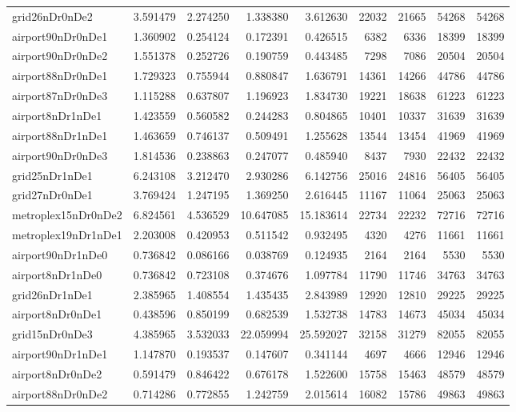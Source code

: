 \begin{longtable}{|l|r|r|r|r|r|r|r|r|}
grid26nDr0nDe2 & 3.591479 & 2.274250 & 1.338380 & 3.612630 & 22032 & 21665 & 54268 & 54268 \\
airport90nDr0nDe1 & 1.360902 & 0.254124 & 0.172391 & 0.426515 & 6382 & 6336 & 18399 & 18399 \\
airport90nDr0nDe2 & 1.551378 & 0.252726 & 0.190759 & 0.443485 & 7298 & 7086 & 20504 & 20504 \\
airport88nDr0nDe1 & 1.729323 & 0.755944 & 0.880847 & 1.636791 & 14361 & 14266 & 44786 & 44786 \\
airport87nDr0nDe3 & 1.115288 & 0.637807 & 1.196923 & 1.834730 & 19221 & 18638 & 61223 & 61223 \\
airport8nDr1nDe1 & 1.423559 & 0.560582 & 0.244283 & 0.804865 & 10401 & 10337 & 31639 & 31639 \\
airport88nDr1nDe1 & 1.463659 & 0.746137 & 0.509491 & 1.255628 & 13544 & 13454 & 41969 & 41969 \\
airport90nDr0nDe3 & 1.814536 & 0.238863 & 0.247077 & 0.485940 & 8437 & 7930 & 22432 & 22432 \\
grid25nDr1nDe1 & 6.243108 & 3.212470 & 2.930286 & 6.142756 & 25016 & 24816 & 56405 & 56405 \\
grid27nDr0nDe1 & 3.769424 & 1.247195 & 1.369250 & 2.616445 & 11167 & 11064 & 25063 & 25063 \\
metroplex15nDr0nDe2 & 6.824561 & 4.536529 & 10.647085 & 15.183614 & 22734 & 22232 & 72716 & 72716 \\
metroplex19nDr1nDe1 & 2.203008 & 0.420953 & 0.511542 & 0.932495 & 4320 & 4276 & 11661 & 11661 \\
airport90nDr1nDe0 & 0.736842 & 0.086166 & 0.038769 & 0.124935 & 2164 & 2164 & 5530 & 5530 \\
airport8nDr1nDe0 & 0.736842 & 0.723108 & 0.374676 & 1.097784 & 11790 & 11746 & 34763 & 34763 \\
grid26nDr1nDe1 & 2.385965 & 1.408554 & 1.435435 & 2.843989 & 12920 & 12810 & 29225 & 29225 \\
airport8nDr0nDe1 & 0.438596 & 0.850199 & 0.682539 & 1.532738 & 14783 & 14673 & 45034 & 45034 \\
grid15nDr0nDe3 & 4.385965 & 3.532033 & 22.059994 & 25.592027 & 32158 & 31279 & 82055 & 82055 \\
airport90nDr1nDe1 & 1.147870 & 0.193537 & 0.147607 & 0.341144 & 4697 & 4666 & 12946 & 12946 \\
airport8nDr0nDe2 & 0.591479 & 0.846422 & 0.676178 & 1.522600 & 15758 & 15463 & 48579 & 48579 \\
airport88nDr0nDe2 & 0.714286 & 0.772855 & 1.242759 & 2.015614 & 16082 & 15786 & 49863 & 49863 \\

\end{longtable}
